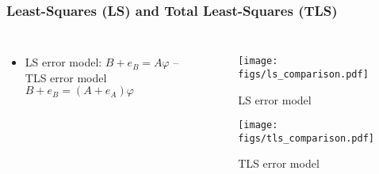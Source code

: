 \documentclass[aspectratio=1610]{beamer}
\begin{document}
\begin{frame}
\frametitle{Least-Squares (LS)  and Total Least-Squares (TLS)}
\begin{columns}
\column{37em}
\begin{itemize}\itemsep1em
  \justifying
  \item LS error model: $B + e_B = A \varphi$ – TLS error model $B + e_B = (A + e_A) \varphi$
\end{itemize}

\begin{figure}
\centering
  \begin{minipage}{.49\textwidth}
  \centering
  \texttt{[image: figs/ls\_comparison.pdf]}
  \vspace{-0.3cm}
  \caption{LS error model}
  \end{minipage}
  \begin{minipage}{.49\textwidth}
  \centering
  \texttt{[image: figs/tls\_comparison.pdf]}
  \vspace{-0.3cm}
  \caption{TLS error model}
  \end{minipage}
\end{figure}


\end{columns}
\end{frame}
\end{document}
